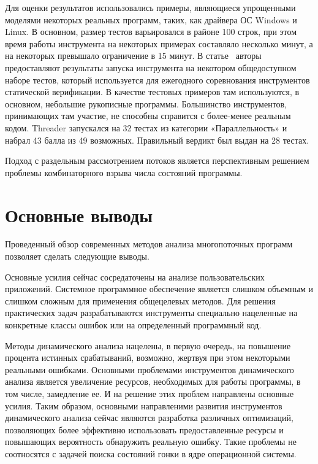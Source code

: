Для оценки результатов использовались примеры, являющиеся упрощенными моделями некоторых реальных программ, таких, как драйвера ОС Windows и Linux.
В основном, размер тестов варьировался в районе 100 строк, при этом время работы инструмента на некоторых примерах составляло несколько минут, а на некоторых превышало ограничение в 15 минут. 
В статье~\cite{Threader:svcomp} авторы предоставляют результаты запуска инструмента на некотором общедоступном наборе тестов, который используется для ежегодного соревнования инструментов статической верификации. 
В качестве тестовых примеров там используются, в основном, небольшие рукописные программы.
Большинство инструментов, принимающих там участие, не способны справится с более-менее реальным кодом.
Threader запускался на 32 тестах из категории «Параллельность» и набрал 43 балла из 49 возможных. Правильный вердикт был выдан на 28 тестах.

Подход с раздельным рассмотрением потоков является перспективным решением проблемы комбинаторного взрыва числа состояний программы.



\section{Основные выводы}
\label{rw:conclusion}
Проведенный обзор современных методов анализа многопоточных программ позволяет сделать следующие выводы.

Основные усилия сейчас сосредаточены на анализе пользовательских приложений.
Системное программное обеспечение является слишком объемным и слишком сложным для применения общецелевых методов.
Для решения практических задач разрабатываются инструменты специально нацеленные на конкретные классы ошибок или на определенный программный код.

Методы динамического анализа нацелены, в первую очередь, на повышение процента истинных срабатываний, возможно, жертвуя при этом некоторыми реальными ошибками.
Основными проблемами инструментов динамического анализа является увеличение ресурсов, необходимых для работы программы, в том числе, замедление ее.
И на решение этих проблем направлены основные усилия.
Таким образом, основными направленими развития инструментов динамического анализа сейчас являются разработка различных оптимизаций, позволяющих более эффективно использовать предоставленные ресурсы и повышающих вероятность обнаружить реальную ошибку.
Такие проблемы не соотносятся с задачей поиска состояний гонки в ядре операционной системы.

